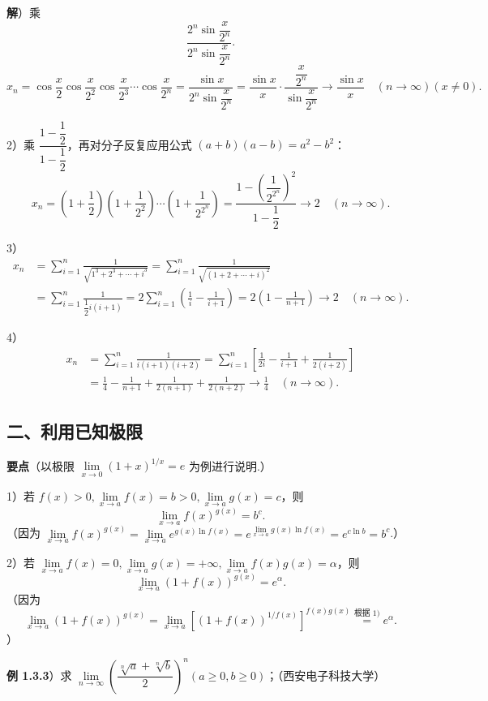 \documentclass[UTF8,12pt,a4paper,fontset=fandol]{ctexart}
\begin{document}
\noindent\textbf{解}）乘
\[
  \frac{2^n\sin\dfrac{x}{2^n}}{2^n\sin\dfrac{x}{2^n}}.
\]
\[
x_n=\cos\frac{x}{2}\cos\frac{x}{2^2}\cos\frac{x}{2^3}\cdots\cos\frac{x}{2^n}
=\frac{\sin x}{2^n\sin\dfrac{x}{2^n}}
=\frac{\sin x}{x}\cdot\frac{\dfrac{x}{2^n}}{\sin\dfrac{x}{2^n}}
\to\frac{\sin x}{x}\quad(n\to\infty)(x\ne0).
\]

2）乘 $\dfrac{1-\dfrac12}{1-\dfrac12}$，再对分子反复应用公式 $(a+b)(a-b)=a^2-b^2$：
\[
x_n=\left(1+\frac12\right)\left(1+\frac1{2^2}\right)\cdots\left(1+\frac1{2^{2^n}}\right)
=\frac{1-\left(\dfrac1{2^{2^n}}\right)^2}{1-\dfrac12}\to2\quad(n\to\infty).
\]

3）
\[
\begin{aligned}
x_n
&=\sum_{i=1}^n\frac1{\sqrt{1^3+2^3+\cdots+i^3}}
=\sum_{i=1}^n\frac1{\sqrt{(1+2+\cdots+i)^2}}\\
&=\sum_{i=1}^n\frac1{\dfrac12 i(i+1)}
=2\sum_{i=1}^n\left(\frac1i-\frac1{i+1}\right)
=2\left(1-\frac1{n+1}\right)\to2\quad(n\to\infty).
\end{aligned}
\]

4）
\[
\begin{aligned}
x_n&=\sum_{i=1}^n\frac1{i(i+1)(i+2)}
=\sum_{i=1}^n\left[\frac1{2i}-\frac1{i+1}+\frac1{2(i+2)}\right]\\
&=\frac14-\frac1{n+1}+\frac1{2(n+1)}+\frac1{2(n+2)}
\to\frac14\quad(n\to\infty).
\end{aligned}
\]

\subsection*{二、利用已知极限}

\noindent\textbf{要点}\quad （以极限 $\lim\limits_{x\to0}(1+x)^{1/x}=e$ 为例进行说明.）

1）若 $f(x)>0,\lim\limits_{x\to a}f(x)=b>0,\lim\limits_{x\to a}g(x)=c$，则
\[
  \lim_{x\to a}f(x)^{g(x)}=b^c.
\]
（因为 $\lim\limits_{x\to a}f(x)^{g(x)}
=\lim\limits_{x\to a}e^{g(x)\ln f(x)}
=e^{\lim\limits_{x\to a}g(x)\ln f(x)}=e^{c\ln b}=b^c$.）

2）若 $\lim\limits_{x\to a}f(x)=0,\lim\limits_{x\to a}g(x)=+\infty,\lim\limits_{x\to a}f(x)g(x)=\alpha$，则
\[
  \lim_{x\to a}(1+f(x))^{g(x)}=e^\alpha.
\]
（因为
\[
\lim_{x\to a}(1+f(x))^{g(x)}
=\lim_{x\to a}\left[(1+f(x))^{1/f(x)}\right]^{f(x)g(x)}
\stackrel{\text{根据 1)}}{=}e^\alpha.
\]）

\noindent\textbf{例 1.3.3}）求 $\lim\limits_{n\to\infty}\left(\dfrac{\sqrt[n]{a}+\sqrt[n]{b}}2\right)^n(a\ge0,b\ge0)$；（西安电子科技大学）
\end{document}
